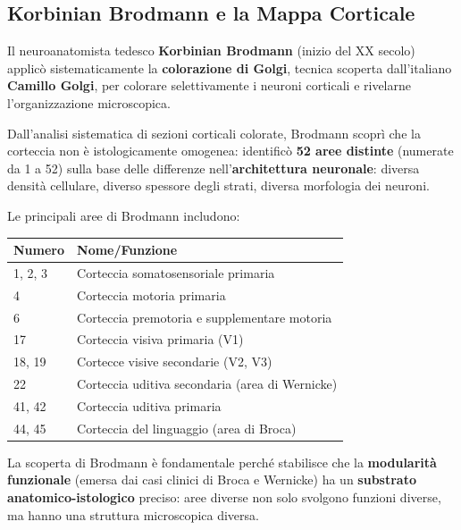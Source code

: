\subsection{Korbinian Brodmann e la Mappa Corticale}

Il neuroanatomista tedesco \textbf{Korbinian Brodmann} (inizio del XX secolo) applicò sistematicamente la \textbf{colorazione di Golgi}, tecnica scoperta dall'italiano \textbf{Camillo Golgi}, per colorare selettivamente i neuroni corticali e rivelarne l'organizzazione microscopica.

Dall'analisi sistematica di sezioni corticali colorate, Brodmann scoprì che la corteccia non è istologicamente omogenea: identificò \textbf{52 aree distinte} (numerate da 1 a 52) sulla base delle differenze nell'\textbf{architettura neuronale}: diversa densità cellulare, diverso spessore degli strati, diversa morfologia dei neuroni.

Le principali aree di Brodmann includono:

\begin{table}[htbp]
    \centering
    \renewcommand{\arraystretch}{1.3}
    \begin{tabularx}{\textwidth}{|l|X|}
    \hline
    \textbf{Numero} & \textbf{Nome/Funzione} \\
    \hline
    1, 2, 3 & Corteccia somatosensoriale primaria \\
    4 & Corteccia motoria primaria \\
    6 & Corteccia premotoria e supplementare motoria \\
    17 & Corteccia visiva primaria (V1) \\
    18, 19 & Cortecce visive secondarie (V2, V3) \\
    22 & Corteccia uditiva secondaria (area di Wernicke) \\
    41, 42 & Corteccia uditiva primaria \\
    44, 45 & Corteccia del linguaggio (area di Broca) \\
    \hline
    \end{tabularx}
\end{table}

\begin{tcolorbox}[colback=gray!5, colframe=gray!40, arc=2mm, boxrule=0.5pt]
La scoperta di Brodmann è fondamentale perché stabilisce che la \textbf{modularità funzionale} (emersa dai casi clinici di Broca e Wernicke) ha un \textbf{substrato anatomico-istologico} preciso: aree diverse non solo svolgono funzioni diverse, ma hanno una struttura microscopica diversa.
\end{tcolorbox}



